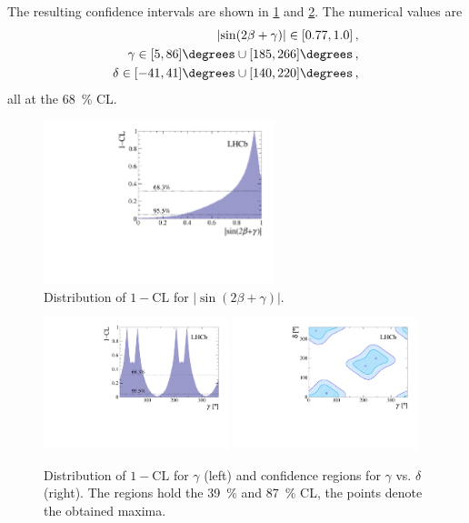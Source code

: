 The resulting confidence intervals are shown in \cref{fig:sin2betaplusGamma} and \ref{fig:GammaAndGammavsdelta}.
The numerical values are
\begin{align*}
\left|\sin\!\left(2\beta+\gamma\right)\right|\in[0.77, 1.0]\,,\\
\gamma\in[5, 86]\degrees\cup[185, 266]\degrees\,,\\
\delta\in[-41, 41]\degrees\cup[140, 220]\degrees\,,\\
\end{align*}
all at the \SI{68}{\percent} CL.
\begin{figure}[tbp]
    \centering
    \includegraphics[width=0.6\textwidth]{12Result/figs/Sin2BetaPGamma.pdf}
    \caption{Distribution of $1-\text{CL}$ for $\left|\sin\!\left(2\beta+\gamma\right)\right|$.}
    \label{fig:sin2betaplusGamma}
\end{figure}
\begin{figure}[tbp]
    \centering
    \includegraphics[width=0.48\textwidth]{12Result/figs/Gamma.pdf}
    \includegraphics[width=0.48\textwidth]{12Result/figs/GammavsDelta.pdf}
    \caption{Distribution of $1-\text{CL}$ for $\gamma$ (left) and confidence regions for $\gamma$ vs. $\delta$ (right).
    The regions hold the \SI{39}{\percent} and \SI{87}{\percent} CL, the points denote the obtained maxima.}
    \label{fig:GammaAndGammavsdelta}
\end{figure}
